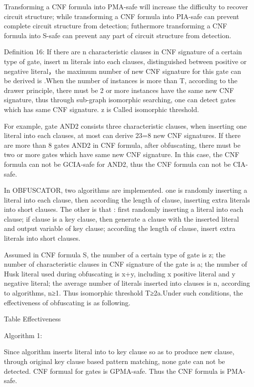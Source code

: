 \documentclass[runningheads,a4paper]{llncs}
\begin{document}
Transforming a CNF formula into PMA-safe will increase the difficulty to recover circuit structure; while transforming a CNF formula into PIA-safe can prevent complete circuit structure from detection; futhermore  transforming a CNF formula into S-safe can prevent any part of circuit structure from detection.

\noindent \newline Definition 16: If there are n characteristic clauses in CNF signature of a certain type of gate, insert m literals into each clauses, distinguished between positive or negative literal，the maximum number of new CNF signature for this gate can be derived is  .When the number of instances is more than T, according to the drawer principle, there must be 2 or more instances have the same new CNF signature, thus through sub-graph isomorphic searching, one can detect gates which has same CNF signature. z is Called isomorphic threshold.

For example, gate AND2 consists three characteristic clauses, when inserting one literal into each clauses, at most can derive 23=8 new CNF signatures. If there are more than 8 gates AND2 in CNF formula, after obfuscating, there must be two or more gates which have same new CNF signature. In this case, the CNF formula can not be GCIA-safe for AND2, thus the CNF formula can not be CIA-safe.

In OBFUSCATOR, two algorithms are implemented. one is randomly inserting a literal into each clause, then according the length of clause, inserting extra literals into short clauses. The other is that : first randomly inserting a literal into each clause; if clause is a key clause, then generate a clause with the inserted literal and output variable of key clause; according the length of clause, insert extra literals into short clauses.

Assumed in CNF formula S, the number of a certain type of gate is z; the number of characteristic clauses in CNF signature of the gate is a; the number of Husk literal used during obfuscating is x+y, including x positive literal and y negative literal; the average number of literals inserted into clauses is n, according to algorithms, n≥1. Thus isomorphic threshold T≥2a.Under such conditions, the effectiveness of obfuscating is as following. 

Table Effectiveness

\noindent Algorithm 1:

Since algorithm inserts literal into to key clause so as to produce new clause, through original key clause based pattern matching, none gate can not be detected. CNF formual for gates is GPMA-safe. Thus the CNF formula is PMA-safe.
\end{document}
